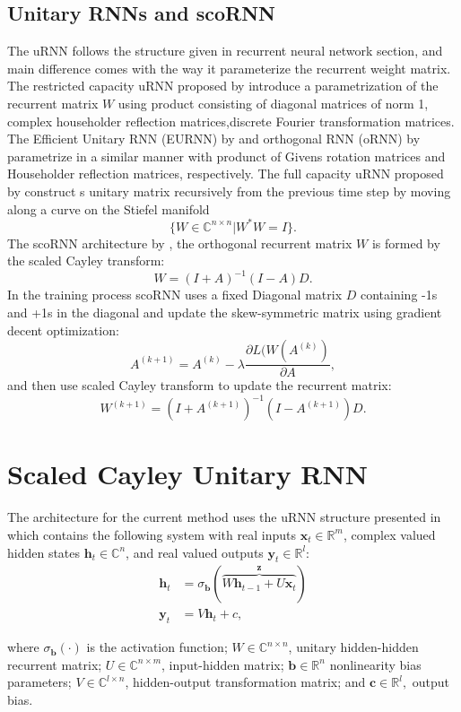 \documentclass[letterpaper]{article} %
\begin{document}
\subsection{Unitary RNNs and scoRNN}
The uRNN follows the structure given in recurrent neural network section, and main difference comes with the way it parameterize the recurrent weight matrix. The restricted capacity uRNN proposed by \cite{Arjo16} introduce a parametrization of the recurrent matrix $W$ using product consisting of diagonal matrices of norm 1, complex householder reflection matrices,discrete Fourier transformation matrices. The Efficient Unitary RNN (EURNN) by \cite{jing16} and orthogonal RNN (oRNN) by \cite{Mhammadi17} parametrize in a similar manner with produnct of Givens rotation matrices and Householder reflection matrices, respectively. The full capacity uRNN proposed by \cite{Wisdom16} construct s unitary matrix recursively from the previous time step by moving along a curve on the Stiefel manifold 
$$\{W \in \mathbb{C}^{n \times n} | W^*W =I\}.$$ 
The scoRNN architecture by \cite{kyle17}, the orthogonal recurrent matrix $W$ is formed by the scaled Cayley transform:
$$W = (I+A)^{-1}(I-A)D. $$
In the training process scoRNN uses a fixed Diagonal matrix $D$ containing -1s and +1s in the diagonal and update the skew-symmetric matrix using gradient decent optimization:
$$A ^{(k+1)} = A^{(k)} -\lambda \frac{ \partial L(W(A^{(k)})}{\partial A} ,$$
and then use scaled Cayley transform to update the recurrent matrix:
$$ W^{(k+1)} = (I+A ^{(k+1)})^{-1}(I-A ^{(k+1)})D.  $$

\section{Scaled Cayley Unitary RNN}

\noindent The architecture for the current method uses the uRNN structure presented in \cite{Arjo16} which contains the following system with real inputs $\textbf{x}_t \in \mathbb{R}^m$, complex valued hidden states $\textbf{h}_t\in \mathbb{C}^n$, and real valued outputs $\textbf{y}_t \in \mathbb{R}^l:$ 
\begin{align*}
 \textbf{h}_t &= \sigma_{\textbf{b}}(\overbrace{W\textbf{h}_{t-1} +U\textbf{x}_t}^{\textbf{z}}) \\
 \textbf{y}_t &= V \textbf{h}_t +c,
\end{align*}

where $\sigma_{\textbf{b}}(\cdot)$ is the activation function; $W \in \mathbb{C}^{n \times n}$, unitary hidden-hidden recurrent matrix; $U \in \mathbb{C}^{n\times m}$, input-hidden matrix; $\textbf{b}\in \mathbb{R}^n$ nonlinearity bias parameters; $V \in \mathbb{C}^{l\times n}$, hidden-output transformation matrix; and $\textbf{c} \in \mathbb{R}^l,$ output bias.\\
\end{document}
